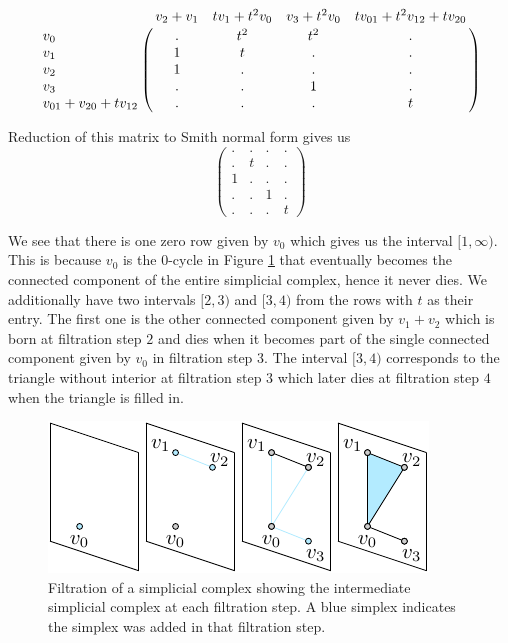 \begin{example}
  \[
    \bordermatrix{& v_{2}+v_{1} & tv_{1}+t^{2}v_{0} & v_{3}+t^{2}v_{0} & tv_{01}+t^{2}v_{12}+tv_{20} \cr
      v_{0} & . & t^{2} & t^{2} & . \cr
      v_{1} & 1 & t & . & .     \cr
      v_{2} & 1 & . & . & .     \cr
      v_{3} & . & . & 1 & .     \cr
      v_{01}+v_{20}+tv_{12}  & . & . & . & t
      }
  \]

  Reduction of this matrix to Smith normal form gives us
  \[
    \begin{pmatrix}
      . & . & . & . \\
      . & t & . & .     \\
        1 & . & . & .     \\
        . & . & 1 & .     \\
        . & . & . & t
        \end{pmatrix}
  \]

 We see that there is one zero row given by $v_{0}$ which gives us the interval $[1,\infty)$. This is because $v_{0}$ is the $0$-cycle in Figure \ref{filtrationstack} that eventually becomes the connected component of the entire simplicial complex, hence it never dies. We additionally have two intervals $[2,3)$ and $[3,4)$ from the rows with $t$ as their entry. The first one is the other connected component given by $v_{1}+v_{2}$ which is born at filtration step $2$ and dies when it becomes part of the single connected component given by $v_{0}$ in filtration step 3. The interval $[3,4)$ corresponds to the triangle without interior at filtration step $3$ which later dies at filtration step $4$ when the triangle is filled in.


\begin{figure}[ht]
  \centering
  \includegraphics[scale=1.5]{simp_filt.pdf}
  \caption{\label{filtrationstack} Filtration of a simplicial complex showing the intermediate simplicial complex at each filtration step. A blue simplex indicates the simplex was added in that filtration step.}
\end{figure}

\end{example}

